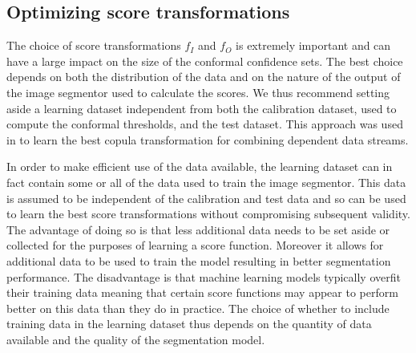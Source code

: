 \subsection{Optimizing score transformations}
The choice of score transformations $f_I$ and $f_O$ is extremely important and can have a large impact on the size of the conformal confidence sets. The best choice depends on both the distribution of the data and on the nature of the output of the image segmentor used to calculate the scores. We thus recommend setting aside a learning dataset independent from both the calibration dataset, used to compute the conformal thresholds, and the test dataset. This approach was used in \cite{Sun2024} to learn the best copula transformation for combining dependent data streams.

In order to make efficient use of the data available, the learning dataset can in fact contain some or all of the data used to train the image segmentor. This data is assumed to be independent of the calibration and test data and so can be used to learn the best score transformations without compromising subsequent validity. The advantage of doing so is that less additional data needs to be set aside or collected for the purposes of learning a score function. Moreover it allows for additional data to be used to train the model resulting in better segmentation performance. The disadvantage is that machine learning models typically overfit their training data meaning that certain score functions may appear to perform better on this data than they do in practice. The choice of whether to include training data in the learning dataset thus depends on the quantity of data available and the quality of the segmentation model.

